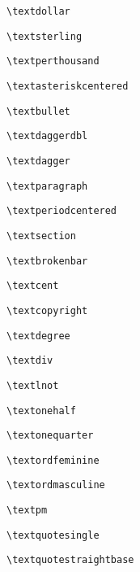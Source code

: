 \documentclass{scrartcl}
\begin{document}
\parindent=0pt
\selectfont
\def\testglyph{A}
\def\wrapglyph#1{#1}

\wrapglyph{\textdollar} \verb+\textdollar+\par
\wrapglyph{\textsterling} \verb+\textsterling+\par
\wrapglyph{\textperthousand} \verb+\textperthousand+\par
\wrapglyph{\textasteriskcentered} \verb+\textasteriskcentered+\par
\wrapglyph{\textbullet} \verb+\textbullet+\par
\wrapglyph{\textdaggerdbl} \verb+\textdaggerdbl+\par
\wrapglyph{\textdagger} \verb+\textdagger+\par
\wrapglyph{\textparagraph} \verb+\textparagraph+\par
\wrapglyph{\textperiodcentered} \verb+\textperiodcentered+\par
\wrapglyph{\textsection} \verb+\textsection+\par
\wrapglyph{\textbrokenbar} \verb+\textbrokenbar+\par
\wrapglyph{\textcent} \verb+\textcent+\par
\wrapglyph{\textcopyright} \verb+\textcopyright+\par
\wrapglyph{\textdegree} \verb+\textdegree+\par
\wrapglyph{\textdiv} \verb+\textdiv+\par
\wrapglyph{\textlnot} \verb+\textlnot+\par
\wrapglyph{\textonehalf} \verb+\textonehalf+\par
\wrapglyph{\textonequarter} \verb+\textonequarter+\par
\wrapglyph{\textordfeminine} \verb+\textordfeminine+\par
\wrapglyph{\textordmasculine} \verb+\textordmasculine+\par
\wrapglyph{\textpm} \verb+\textpm+\par
\wrapglyph{\textquotesingle} \verb+\textquotesingle+\par
\wrapglyph{\textquotestraightbase} \verb+\textquotestraightbase+\par
\end{document}

